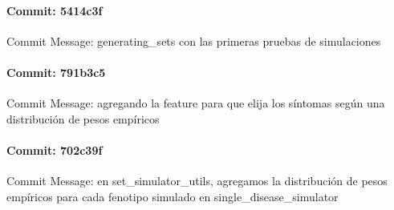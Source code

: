 \documentclass{article}
\begin{document}
\paragraph{Commit: 5414c3f}
Commit Message: generating_sets con las primeras pruebas de simulaciones

\paragraph{Commit: 791b3c5}
Commit Message: agregando la feature para que elija los síntomas según una distribución de pesos empíricos

\paragraph{Commit: 702c39f}
Commit Message: en set_simulator_utils, agregamos la distribución de pesos empíricos para cada fenotipo simulado en single_disease_simulator

\end{document}
